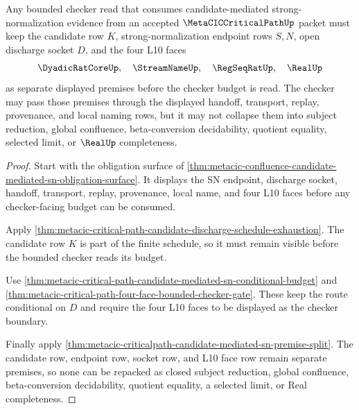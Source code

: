 \begin{theorem}
\label{thm:metacic-critical-path-bounded-checker-frontier-separation}
Any bounded checker read that consumes candidate-mediated strong-normalization evidence from an accepted $\MetaCICCriticalPathUp$ packet must keep the candidate row $K$, strong-normalization endpoint rows $S,N$, open discharge socket $D$, and the four L10 faces
$$
\DyadicRatCoreUp,\quad \StreamNameUp,\quad \RegSeqRatUp,\quad \RealUp
$$
as separate displayed premises before the checker budget is read. The checker may pass those premises through the displayed handoff, transport, replay, provenance, and local naming rows, but it may not collapse them into subject reduction, global confluence, beta-conversion decidability, quotient equality, selected limit, or $\RealUp$ completeness.
\end{theorem}
\begin{proof}
Start with the obligation surface of \autoref{thm:metacic-confluence-candidate-mediated-sn-obligation-surface}. It displays the SN endpoint, discharge socket, handoff, transport, replay, provenance, local name, and four L10 faces before any checker-facing budget can be consumed.

Apply \autoref{thm:metacic-critical-path-candidate-discharge-schedule-exhaustion}. The candidate row $K$ is part of the finite schedule, so it must remain visible before the bounded checker reads its budget.

Use \autoref{thm:metacic-critical-path-candidate-mediated-sn-conditional-budget} and \autoref{thm:metacic-critical-path-four-face-bounded-checker-gate}. These keep the route conditional on $D$ and require the four L10 faces to be displayed as the checker boundary.

Finally apply \autoref{thm:metacic-criticalpath-candidate-mediated-sn-premise-split}. The candidate row, endpoint row, socket row, and L10 face row remain separate premises, so none can be repacked as closed subject reduction, global confluence, beta-conversion decidability, quotient equality, a selected limit, or Real completeness.
\end{proof}


